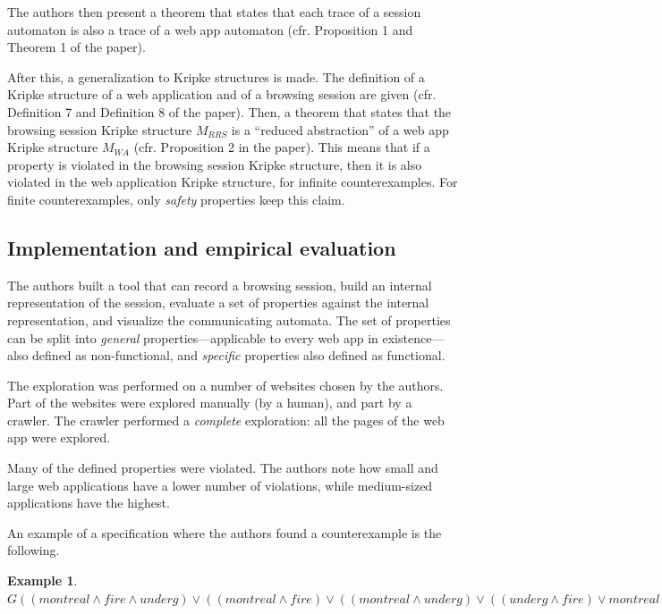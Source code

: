 \documentclass[a4paper,10pt]{article}
\theoremstyle{plain} %
\theoremstyle{definition}
\newtheorem{example}{Example}
\theoremstyle{remark}
\begin{document}
The authors then present a theorem that states that each trace of a session automaton is also a trace of a web app automaton (cfr. Proposition 1 and Theorem 1 of the paper).

After this, a generalization to Kripke structures is made. The definition of a Kripke structure of a web application and of a browsing session are given (cfr. Definition 7 and Definition 8 of the paper). Then, a theorem that states that the browsing session Kripke structure $M_{RRS}$ is a ``reduced abstraction'' of a web app Kripke structure $M_{WA}$ (cfr. Proposition 2 in the paper). This means that if a property is violated in the browsing session Kripke structure, then it is also violated in the web application Kripke structure, for infinite counterexamples. For finite counterexamples, only \textit{safety} properties keep this claim.

\subsection{Implementation and empirical evaluation}

The authors built a tool that can record a browsing session, build an internal representation of the session, evaluate a set of properties against the internal representation, and visualize the communicating automata. The set of properties can be split into \textit{general} properties---applicable to every web app in existence---also defined as non-functional, and \textit{specific} properties also defined as functional.

The exploration was performed on a number of websites chosen by the authors. Part of the websites were explored manually (by a human), and part by a crawler. The crawler performed a \emph{complete} exploration: all the pages of the web app were explored.

Many of the defined properties were violated. The authors note how small and large web applications have a lower number of violations, while medium-sized applications have the highest.

An example of a specification where the authors found a counterexample is the following.

\begin{example}
  \begin{math}
    G((montreal\land fire\land underg)\lor((montreal\land fire)\lor((montreal\land underg)\lor((underg\land fire)\lor montreal\lor underg\lor fire))))
  \end{math}
\end{example}
\end{document}
